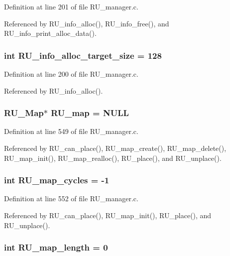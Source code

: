 Definition at line 201 of file RU\_\-manager.c.

Referenced by RU\_\-info\_\-alloc(), RU\_\-info\_\-free(), and RU\_\-info\_\-print\_\-alloc\_\-data().
\subsubsection{\setlength{\rightskip}{0pt plus 5cm}int \bf{RU\_\-info\_\-alloc\_\-target\_\-size} = 128}\label{RU__manager_8c_cc700ea8ef1b28e647eb33ac7847efb5}




Definition at line 200 of file RU\_\-manager.c.

Referenced by RU\_\-info\_\-alloc().
\subsubsection{\setlength{\rightskip}{0pt plus 5cm}\bf{RU\_\-Map}$\ast$ \bf{RU\_\-map} = \bf{NULL}}\label{RU__manager_8c_1ec86ac6a189f5faa72bf350572c35e1}




Definition at line 549 of file RU\_\-manager.c.

Referenced by RU\_\-can\_\-place(), RU\_\-map\_\-create(), RU\_\-map\_\-delete(), RU\_\-map\_\-init(), RU\_\-map\_\-realloc(), RU\_\-place(), and RU\_\-unplace().
\subsubsection{\setlength{\rightskip}{0pt plus 5cm}int \bf{RU\_\-map\_\-cycles} = -1}\label{RU__manager_8c_5b28f480dd80edd9d86edc9bfd31ce2b}




Definition at line 552 of file RU\_\-manager.c.

Referenced by RU\_\-can\_\-place(), RU\_\-map\_\-init(), RU\_\-place(), and RU\_\-unplace().
\subsubsection{\setlength{\rightskip}{0pt plus 5cm}int \bf{RU\_\-map\_\-length} = 0}\label{RU__manager_8c_f866276404030638648a12e4eb39e048}




